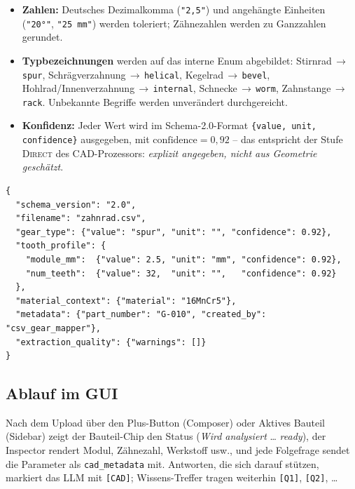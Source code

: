 \documentclass[12pt, a4paper]{article}
\begin{document}
\begin{itemize}[itemsep=2pt]
  \item \textbf{Zahlen:} Deutsches Dezimalkomma (\texttt{"2,5"}) und angehängte
        Einheiten (\texttt{"20°"}, \texttt{"25 mm"}) werden toleriert;
        Zähnezahlen werden zu Ganzzahlen gerundet.
  \item \textbf{Typbezeichnungen} werden auf das interne Enum abgebildet:
        Stirnrad\,$\rightarrow$\,\texttt{spur},
        Schrägverzahnung\,$\rightarrow$\,\texttt{helical},
        Kegelrad\,$\rightarrow$\,\texttt{bevel},
        Hohlrad/Innenverzahnung\,$\rightarrow$\,\texttt{internal},
        Schnecke\,$\rightarrow$\,\texttt{worm},
        Zahnstange\,$\rightarrow$\,\texttt{rack}.
        Unbekannte Begriffe werden unverändert durchgereicht.
  \item \textbf{Konfidenz:} Jeder Wert wird im Schema-2.0-Format
        \texttt{\{value, unit, confidence\}} ausgegeben, mit
        $\text{confidence} = 0{,}92$ -- das entspricht der Stufe
        \textsc{Direct} des CAD-Prozessors: \emph{explizit angegeben, nicht aus
        Geometrie geschätzt}.
\end{itemize}

\begin{lstlisting}[style=datastyle, caption={Auszug der Antwort von \texttt{POST /cad/from-csv}}]
{
  "schema_version": "2.0",
  "filename": "zahnrad.csv",
  "gear_type": {"value": "spur", "unit": "", "confidence": 0.92},
  "tooth_profile": {
    "module_mm":  {"value": 2.5, "unit": "mm", "confidence": 0.92},
    "num_teeth":  {"value": 32,  "unit": "",   "confidence": 0.92}
  },
  "material_context": {"material": "16MnCr5"},
  "metadata": {"part_number": "G-010", "created_by": "csv_gear_mapper"},
  "extraction_quality": {"warnings": []}
}
\end{lstlisting}

\subsection{Ablauf im GUI}

Nach dem Upload über den Plus-Button (Composer) oder \glqq Aktives Bauteil\grqq{}
(Sidebar) zeigt der Bauteil-Chip den Status (\emph{Wird analysiert} \dots{}
\emph{ready}), der Inspector rendert Modul, Zähnezahl, Werkstoff usw., und jede
Folgefrage sendet die Parameter als \texttt{cad\_metadata} mit. Antworten, die
sich darauf stützen, markiert das LLM mit \texttt{[CAD]}; Wissens-Treffer
tragen weiterhin \texttt{[Q1]}, \texttt{[Q2]}, \dots
\end{document}
